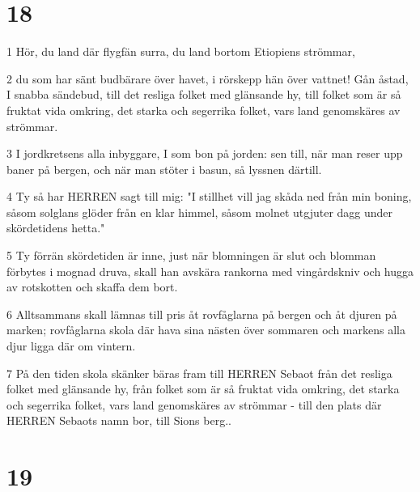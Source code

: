 \chapter{18}

\par 1 Hör, du land där flygfän surra, du land bortom Etiopiens strömmar,
\par 2 du som har sänt budbärare över havet, i rörskepp hän över vattnet! Gån åstad, I snabba sändebud, till det resliga folket med glänsande hy, till folket som är så fruktat vida omkring, det starka och segerrika folket, vars land genomskäres av strömmar.
\par 3 I jordkretsens alla inbyggare, I som bon på jorden: sen till, när man reser upp baner på bergen, och när man stöter i basun, så lyssnen därtill.
\par 4 Ty så har HERREN sagt till mig: "I stillhet vill jag skåda ned från min boning, såsom solglans glöder från en klar himmel, såsom molnet utgjuter dagg under skördetidens hetta."
\par 5 Ty förrän skördetiden är inne, just när blomningen är slut och blomman förbytes i mognad druva, skall han avskära rankorna med vingårdskniv och hugga av rotskotten och skaffa dem bort.
\par 6 Alltsammans skall lämnas till pris åt rovfåglarna på bergen och åt djuren på marken; rovfåglarna skola där hava sina nästen över sommaren och markens alla djur ligga där om vintern.
\par 7 På den tiden skola skänker bäras fram till HERREN Sebaot från det resliga folket med glänsande hy, från folket som är så fruktat vida omkring, det starka och segerrika folket, vars land genomskäres av strömmar - till den plats där HERREN Sebaots namn bor, till Sions berg..

\chapter{19}

